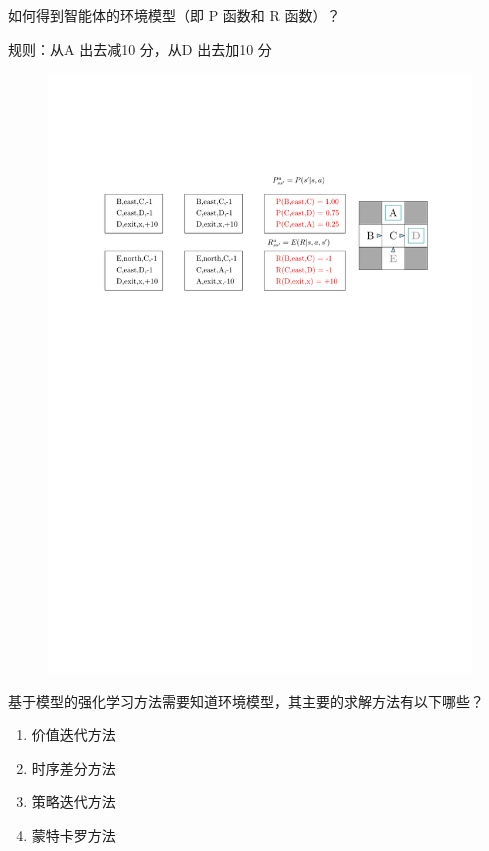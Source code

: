\begin{example}
    如何得到智能体的环境模型（即 P 函数和 R 函数）？
    
    规则：从A 出去减10 分，从D 出去加10 分
    \begin{figure}[htbp]
        \centering
        \includegraphics[width = \textwidth]{image/基于模型的方法.pdf}
    \end{figure}
\end{example}
\begin{example}
    基于模型的强化学习方法需要知道环境模型，其主要的求解方法有以下哪些？
    \begin{enumerate}[A]
        \item \textcolor{main1}{价值迭代方法}
        \item 时序差分方法
        \item \textcolor{main1}{策略迭代方法}
        \item 蒙特卡罗方法
    \end{enumerate}
\end{example}
